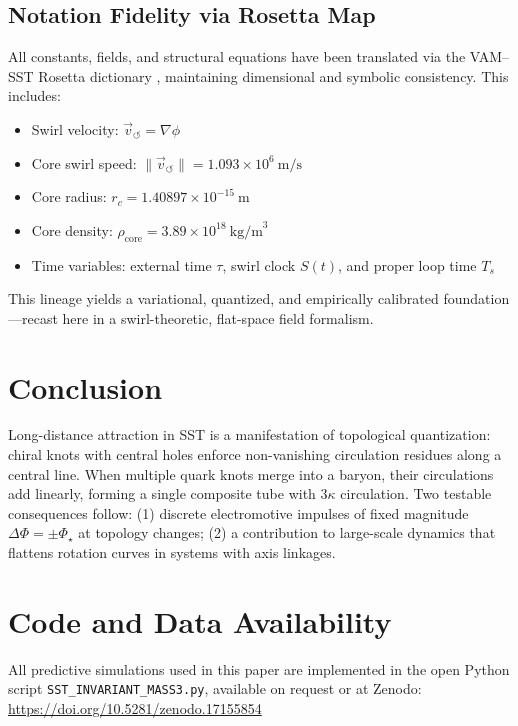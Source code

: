 \documentclass[11pt]{article}
\begin{document}
    \subsection{Notation Fidelity via Rosetta Map}

        All constants, fields, and structural equations have been translated via the VAM–SST Rosetta dictionary \cite{vamrosetta2025}, maintaining dimensional and symbolic consistency. This includes:
        \begin{itemize}
            \item Swirl velocity: $ \vec{v}_{\circlearrowleft} = \nabla \phi $
            \item Core swirl speed: $ \|\vec{v}_{\circlearrowleft}\| = 1.093 \times 10^6\ \text{m/s} $
            \item Core radius: $ r_c = 1.40897 \times 10^{-15}\ \text{m} $
            \item Core density: $ \rho_{\text{core}} = 3.89 \times 10^{18}\ \text{kg/m}^3 $
            \item Time variables: external time $ \tau$, swirl clock $ S(t)$, and proper loop time $ T_s $
        \end{itemize}

        This lineage yields a variational, quantized, and empirically calibrated foundation—recast here in a swirl-theoretic, flat-space field formalism.

\section{Conclusion}

    Long-distance attraction in SST is a manifestation of topological quantization: chiral knots with central holes enforce non-vanishing circulation residues along a central line.
    When multiple quark knots merge into a baryon, their circulations add linearly, forming a single composite tube with $3\kappa$ circulation.
    Two testable consequences follow: (1) discrete electromotive impulses of fixed magnitude $\Delta\Phi=\pm\Phi_\star$ at topology changes; (2) a contribution to large-scale dynamics that flattens rotation curves in systems with axis linkages.


\section*{Code and Data Availability}
    All predictive simulations used in this paper are implemented in the open Python script \texttt{SST\_INVARIANT\_MASS3.py}, available on request or at Zenodo: \url{https://doi.org/10.5281/zenodo.17155854}
\end{document}
